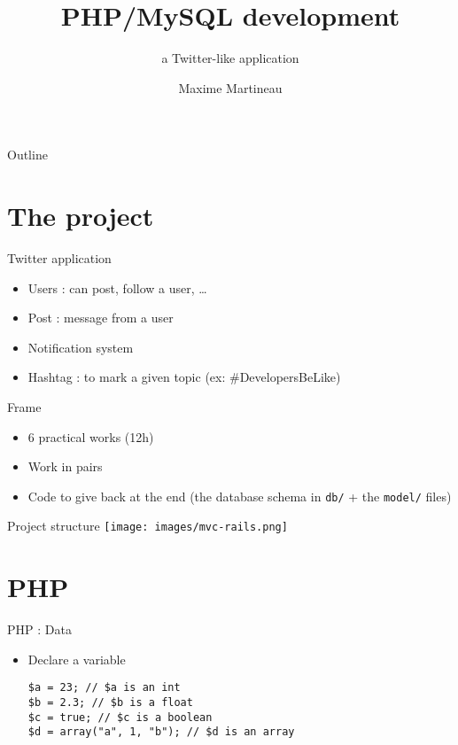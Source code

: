 \documentclass{beamer}
\title{PHP/MySQL development}
\subtitle{a Twitter-like application}
\author{Maxime Martineau}
\institute[Polytech Tours] %
{
    Polytech Tours Département Informatique  
}
\date{}
\begin{document}
\begin{frame}
  \titlepage
\end{frame}

\begin{frame}{Outline}
    \tableofcontents
\end{frame}

\section{The project}
\begin{frame}
    Twitter application
    
    \begin{itemize}
        \item Users : can post, follow a user, …
        \item Post : message from a user
        \item Notification system
        \item Hashtag : to mark a given topic (ex: \#DevelopersBeLike)
    \end{itemize}
\end{frame}

\begin{frame}{Frame}
\begin{itemize}
\item 6 practical works (12h)
\item Work in pairs
\item Code to give back at the end (the database schema in \texttt{db/} + the \texttt{model/} files)
\end{itemize}
\end{frame}

\begin{frame}{Project structure}
\center
\texttt{[image: images/mvc-rails.png]}
\end{frame}

\section{PHP}

\begin{frame}[fragile]{PHP : Data}
    \begin{itemize}
        \item Declare a variable
        \begin{lstlisting}
$a = 23; // $a is an int
$b = 2.3; // $b is a float
$c = true; // $c is a boolean
$d = array("a", 1, "b"); // $d is an array
        \end{lstlisting}
    \end{itemize}
\end{frame}
\end{document}
